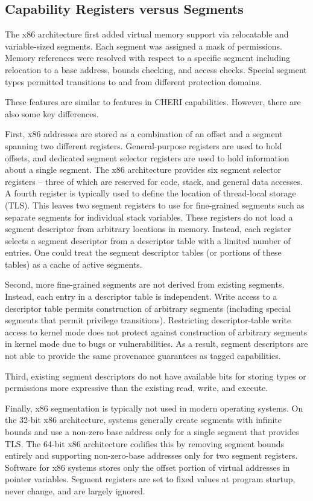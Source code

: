 \subsection{Capability Registers versus Segments}

The x86 architecture first added virtual memory support via
relocatable and variable-sized segments.  Each segment was assigned a
mask of permissions.  Memory references were resolved with respect to a
specific segment including relocation to a base address, bounds
checking, and access checks.  Special segment types permitted transitions
to and from different protection domains.

These features are similar to features in CHERI capabilities.
However, there are also some key differences.

First, x86 addresses are stored as a combination of an offset and a
segment spanning two different registers.  General-purpose registers
are used to hold offsets, and dedicated segment selector registers are
used to hold information about a single segment.  The x86 architecture
provides six segment selector registers -- three of which are reserved
for code, stack, and general data accesses.  A fourth register is
typically used to define the location of thread-local storage (TLS).
This leaves two segment registers to use for fine-grained segments
such as separate segments for individual stack variables.  These
registers do not load a segment descriptor from arbitrary locations in
memory.  Instead, each register selects a segment descriptor from a
descriptor table with a limited number of entries.  One could treat
the segment descriptor tables (or portions of these tables) as a cache
of active segments.

Second, more fine-grained segments are not derived from existing
segments.  Instead, each entry in a descriptor table is independent.
Write access to a descriptor table permits construction of arbitrary
segments (including special segments that permit privilege
transitions).  Restricting descriptor-table write access to kernel
mode does not protect against construction of arbitrary segments in
kernel mode due to bugs or vulnerabilities.  As a result, segment
descriptors are not able to provide the same provenance guarantees as
tagged capabilities.

Third, existing segment descriptors do not have available bits for
storing types or permissions more expressive than the existing
read, write, and execute.

Finally, x86 segmentation is typically not used in modern operating
systems.  On the 32-bit x86 architecture, systems generally create
segments with infinite bounds and use a non-zero base address only
for a single segment that provides TLS.  The 64-bit x86 architecture
codifies this by removing segment bounds entirely and supporting non-zero-base
addresses only for two segment registers.
Software for x86 systems stores only the offset portion of virtual
addresses in pointer variables.  Segment registers are set to fixed
values at program startup, never change, and are largely ignored.

